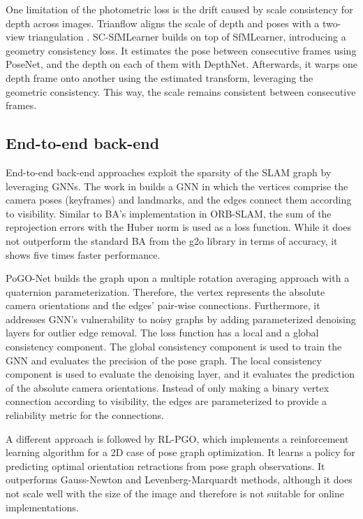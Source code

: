 One limitation of the photometric loss is the drift caused by scale consistency for depth across images. Trianflow aligns the scale of depth and poses with a two-view triangulation \cite{zhao2020trianflow}. SC-SfMLearner \cite{bian2019unsuperviseddepthconsistency} builds on top of SfMLearner, introducing a geometry consistency loss. It estimates the pose between consecutive frames using PoseNet, and the depth on each of them with DepthNet. Afterwards, it warps one depth frame onto another using the estimated transform, leveraging the geometric consistency. This way, the scale remains consistent between consecutive frames.


\subsection{End-to-end back-end}
\label{sec:deeplearning:backend}
End-to-end back-end approaches exploit the sparsity of the \ac{SLAM} graph by leveraging \ac{GNN}s.
The work in \cite{tanaka2021learningbackend} builds a \ac{GNN} in which the vertices comprise the camera poses (keyframes) and landmarks, and the edges connect them according to visibility. Similar to \ac{BA}'s implementation in ORB-SLAM, the sum of the reprojection errors with the Huber norm is used as a loss function. While it does not outperform the standard \ac{BA} from the g2o library \cite{grisetti2011g2o} in terms of accuracy, it shows five times faster performance.

PoGO-Net \cite{li2021pogoNET} builds the graph upon a multiple rotation averaging approach with a quaternion parameterization. Therefore, the vertex represents the absolute camera orientations and the edges' pair-wise connections.
Furthermore, it addresses \ac{GNN}'s vulnerability to noisy graphs by adding parameterized denoising layers for outlier edge removal. The loss function has a local and a global consistency component. The global consistency component is used to train the \ac{GNN} and evaluates the precision of the pose graph. The local consistency component is used to evaluate the denoising layer, and it evaluates the prediction of the absolute camera orientations.
Instead of only making a binary vertex connection according to visibility, the edges are parameterized to provide a reliability metric for the connections.

A different approach is followed by RL-PGO\cite{kourtzanidis2022rlpgo}, which implements a reinforcement learning algorithm for a 2D case of pose graph optimization. It learns a policy for predicting optimal orientation retractions from pose graph observations. It outperforms Gauss-Newton and Levenberg-Marquardt methods, although it does not scale well with the size of the image and therefore is not suitable for online implementations.

